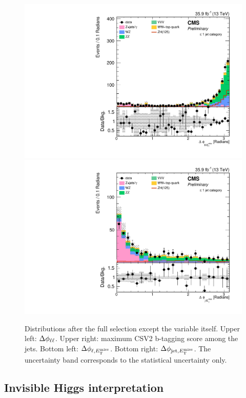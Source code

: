\begin{figure}[hbtp]
\begin{center}
\includegraphics[width=\cmsFigWidth]{figures/zh_1j_dphillmet_allcutsbutone.pdf}
\includegraphics[width=\cmsFigWidth]{figures/zh_1j_dphijmet_allcutsbutone.pdf}
\caption{Distributions after the full selection except the variable itself.
Upper left: $\Delta\phi_{\ell\ell}$. 
Upper right: maximum CSV2 b-tagging score among the jets.
Bottom left: $\Delta \phi_{\ell,E_\mathrm{T}^{\mathrm{miss}}}$.
Bottom right: $\Delta \phi_{{\rm jet},E_\mathrm{T}^{\mathrm{miss}}}$.
The uncertainty band corresponds to the statistical uncertainty only.}
\label{fig:distributions2}
\end{center}
\end{figure}


\clearpage
\subsection{Invisible Higgs interpretation} 

